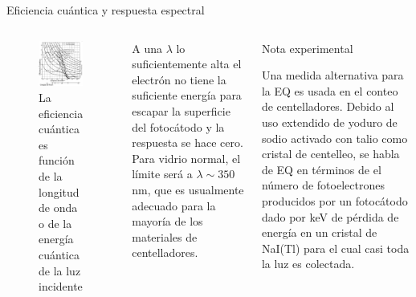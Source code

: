 \documentclass[a4paper,10pt]{beamer}
\begin{document}
\begin{frame}[allowframebreaks]{Eficiencia cuántica y respuesta espectral}
\begin{justify}
  \begin{columns}[c]
  \column{2.3in}
  \begin{figure}
   \includegraphics[scale=0.31]{fig5a}
   \caption{La eficiencia cuántica es función de la longitud de onda
   o de la energía cuántica de la luz incidente}
  \end{figure}
  
  \column{2in}
  \begin{justify}
  \footnotesize{A una $\lambda$ lo suficientemente alta el electrón no tiene la suficiente
  energía para escapar la superficie del fotocátodo y la respuesta se 
  hace cero. Para vidrio normal, el límite será a $\lambda \sim 350$ nm,
  que es usualmente adecuado para la mayoría de los materiales de centelladores.}
  \end{justify}
  
  \begin{exampleblock}{Nota experimental}
   \begin{justify}
   \footnotesize{Una medida alternativa para la EQ es usada en el conteo de 
   centelladores. Debido al uso extendido de yoduro de sodio 
   activado con talio como cristal de centelleo, se habla de EQ 
   en términos de el número de fotoelectrones producidos por un
   fotocátodo dado por keV de pérdida de energía en un cristal
   de NaI(Tl) para el cual casi toda la luz es colectada.}
   \end{justify}
  \end{exampleblock}


\end{columns}
\end{justify}
\end{frame}
\end{document}
